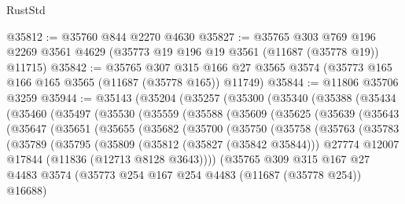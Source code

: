 \begin{lexlean}{RustStd}
\begin{coremodule}
@35812 := @35760 @844 @2270 @4630
@35827 := @35765
    @303
    @769
    @196
    @2269
    @3561
    @4629
    (@35773 @19 @196 @19 @3561 (@11687 (@35778 @19)) @11715)
@35842 := @35765
    @307
    @315
    @166
    @27
    @3565
    @3574
    (@35773 @165 @166 @165 @3565 (@11687 (@35778 @165)) @11749)
@35844 := @11806 @35706 @3259
@35944 := @35143
    (@35204
      (@35257
        (@35300
          (@35340
            (@35388
              (@35434
                (@35460
                  (@35497
                    (@35530
                      (@35559
                        (@35588
                          (@35609
                            (@35625
                              (@35639
                                (@35643
                                  (@35647
                                    (@35651
                                      (@35655
                                        (@35682
                                          (@35700
                                            (@35750
                                              (@35758
                                                (@35763
                                                  (@35783
                                                    (@35789
                                                      (@35795
                                                        (@35809
                                                          (@35812 (@35827 (@35842 @35844)))
                                                          @27774
                                                          @12007
                                                          @17844
                                                          (@11836 (@12713 @8128 @3643))))
                                                      (@35765
                                                        @309
                                                        @315
                                                        @167
                                                        @27
                                                        @4483
                                                        @3574
                                                        (@35773
                                                          @254
                                                          @167
                                                          @254
                                                          @4483
                                                          (@11687 (@35778 @254))
                                                          @16688)

\end{coremodule}
\end{lexlean}
